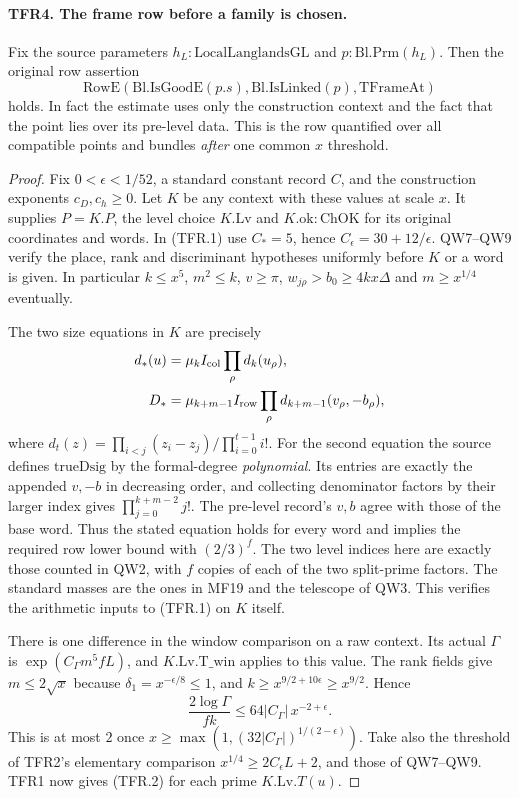 \paragraph{TFR4. The frame row before a family is chosen.}
\label{claim:TFR4}
Fix the source parameters $h_L:\mathrm{LocalLanglandsGL}$ and
$p:\mathrm{Bl.Prm}(h_L)$. Then the original row assertion
\[
\mathrm{RowE}(\mathrm{Bl.IsGoodE}(p.s),\mathrm{Bl.IsLinked}(p),
 \mathrm{TFrameAt})
\]
holds. In fact the estimate uses only the
construction context and the fact that the point lies over its
pre-level data. This is the row quantified over all compatible
points and bundles \emph{after} one common $x$ threshold.

\begin{proof}
Fix $0<\epsilon<1/52$, a standard constant record $C$, and the
construction exponents $c_D,c_h\ge0$. Let $K$ be any context
with these values at scale $x$. It supplies $P=K.P$, the level
choice $K.\mathrm{Lv}$ and $K.\mathrm{ok}:\mathrm{ChOK}$ for its
original coordinates and words. In (TFR.1) use $C_*=5$, hence
$C_\epsilon=30+12/\epsilon$. QW7--QW9 verify the place, rank
and discriminant hypotheses uniformly before $K$ or a word is
given. In particular $k\le x^5$, $m^2\le k$, $v\ge\pi$,
$w_{j\rho}>b_0\ge4kx\Delta$ and $m\ge x^{1/4}$ eventually.

The two size equations in $K$ are precisely
\begin{align*}
 d_*(u)&=\mu_k I_{\rm col}\prod_\rho d_k(u_\rho),\\
 D_*&=\mu_{k+m-1} I_{\rm row}\prod_\rho
                  d_{k+m-1}(v_\rho,-b_\rho),
\end{align*}
where $d_t(z)=\prod_{i<j}(z_i-z_j)/\prod_{i=0}^{t-1}i!$.
For the second equation the source defines
$\mathrm{trueDsig}$ by the formal-degree \emph{polynomial}.
Its entries are exactly the appended $v,-b$ in decreasing order,
and collecting denominator factors by their larger index gives
$\prod_{j=0}^{k+m-2}j!$. The pre-level record's $v,b$ agree with
those of the base word. Thus the stated equation holds for every
word and implies the required row lower bound with $(2/3)^f$.
The two level indices here are exactly those counted in QW2,
with $f$ copies of each of the two split-prime factors. The
standard masses are the ones in MF19 and the telescope of QW3.
This verifies the arithmetic inputs to (TFR.1) on $K$ itself.

There is one difference in the window comparison on a raw
context. Its actual $\Gamma$ is
$\exp(C_\Gamma m^5 fL)$, and $K.\mathrm{Lv}.\mathrm{T\_win}$
applies to this value. The rank fields give
$m\le2\sqrt{x}$ because $\delta_1=x^{-\epsilon/8}\le1$,
and $k\ge x^{9/2+10\epsilon}\ge x^{9/2}$. Hence
\[
 \frac{2\log\Gamma}{fk}
       \le 64|C_\Gamma|\,x^{-2+\epsilon}.
\]
This is at most $2$ once
$x\ge\max(1,(32|C_\Gamma|)^{1/(2-\epsilon)})$.
Take also the threshold of TFR2's elementary comparison
$x^{1/4}\ge2C_\epsilon L+2$, and those of QW7--QW9.
TFR1 now gives (TFR.2) for each prime $K.\mathrm{Lv}.T(u)$.


\end{proof}
